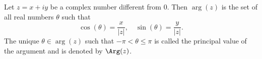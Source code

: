 Let $z = x + iy$ be a complex number different from $0$. Then $\arg(z)$ is the set of all real numbers $\theta$ such that
$$\cos(\theta) = \frac{x}{|z|}, \quad \sin(\theta) = \frac{y}{|z|}.$$
The unique $\theta \in \arg(z)$ such that $-\pi < \theta \leq \pi$ is called the principal value of the argument and is denoted by $\Arg(z)$.
